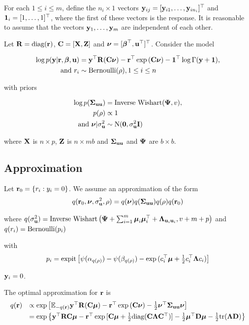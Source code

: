 \documentclass{article}[12pt]
\begin{document}
For each $1 \leq i \leq m$, define the $n_i \times 1$ vectors ${\bf y}_{ij} = [{\bf y}_{i 1}, \ldots, {\bf y}_{i
n_i}]^\top$ and ${\bf 1}_i = [1, \ldots, 1]^\top$, where the first of these vectors is the response. It is
reasonable to assume that the vectors ${\bf y}_1, \ldots, {\bf y}_m$ are independent of each other.

Let ${\bf R} = \text{diag}{({\bf r})}$, ${\bf C} = [{\bf X}, {\bf Z}]$ and ${\boldsymbol \nu} = [{\boldsymbol \beta}^\top, {\bf u}^\top]^\top$. Consider the model

\begin{align*}
\log{p({\bf y}|{\bf r}, {\boldsymbol\beta}, {\bf u})} &= {\bf y}^\top {\bf R} ({\bf C}{\boldsymbol \nu}) - {\bf r}^\top \exp{({\bf C}{\boldsymbol\nu})} - {\bf 1}^\top \log{\Gamma{({\bf y}+ {\bf1})}}, \\
\mbox{ and }
r_i &\sim \text{Bernoulli}(\rho), 1 \leq i \leq n
\end{align*}

with priors

\begin{align*}
\log{p({\boldsymbol\Sigma}_{{\bf u}{\bf u}})} &= \text{Inverse Wishart}({\boldsymbol \Psi}, v),\\
p(\rho) &\propto 1 \\
\mbox{ and } {\boldsymbol\nu}|\sigma_{\bf u}^2 &\sim \mbox{N}({\bf 0}, \sigma_{\bf u}^2 {\bf I})
\end{align*}

where ${\bf X}$ is $n \times p$, ${\bf Z}$ is $n \times mb$ and ${\boldsymbol \Sigma}_{{\bf u} {\bf u}}$ and ${\boldsymbol \Psi}$ are $b \times b$.

\subsection{Approximation}
Let ${\bf r}_0 = \{ r_i : y_i = 0 \}$.
We assume an approximation of the form
$$
q({\bf r}_0, {\boldsymbol \nu}, \sigma_{{\bf u}}^2, \rho) = q({\boldsymbol \nu}) q({\boldsymbol \Sigma}_{{\bf u} {\bf u}}) q(\rho) q({\bf r}_0) \\
$$

where 
$q(\sigma_{{\bf u}}^2) = \mbox{Inverse Wishart}\left({\boldsymbol \Psi} + \sum_{i=1}^m {\boldsymbol \mu}_i {\boldsymbol \mu}_i^\top + {\boldsymbol \Lambda}_{{\bf u}_i {\bf u}_i}, v + m + 
p\right)$ \mbox{and } $q(r_i) = \text{Bernoulli} (p_i)$

with
$$
p_i = \text{expit} \left[ \psi{(\alpha_{q(\rho)})} - \psi{(\beta_{q(\rho)})} - \exp{(c_i^\top{\boldsymbol\mu}+ {\tfrac{1}{2}}c_i^\top {\boldsymbol\Lambda}c_i)} \right]
$$

 ${\bf y}_i = 0$.


The optimal approximation for ${\bf r}$ is
$$
\begin{array}{rl}
q({\bf r}) &\propto \exp \left [ {\mathbb E}_{-q({\bf r})}{\bf y}^\top{\bf R}({\bf C}{\boldsymbol \mu}) - {\bf r}^\top\exp{({\bf C}{\boldsymbol\nu})}-{\tfrac{1}{2}} {\boldsymbol \nu}^\top {\boldsymbol\Sigma}_{{\bf u} {\bf u}} {\boldsymbol \nu} \right ] \\ [1ex]
	&= \exp{ \left\{ {\bf y}^\top{\bf R}{\bf C}{\boldsymbol\mu}- {\bf r}^\top \exp{[{\bf C}{\boldsymbol\mu}+ {\tfrac{1}{2}}\text{diag}({\bf C}{\boldsymbol\Lambda}{\bf C}^\top)]} - {\tfrac{1}{2}}{\boldsymbol\mu}^\top {\bf D}{\boldsymbol\mu}- {\tfrac{1}{2}}\text{tr}({\boldsymbol\Lambda}{\bf D}) \right\} }
\end{array}
$$
\end{document}
